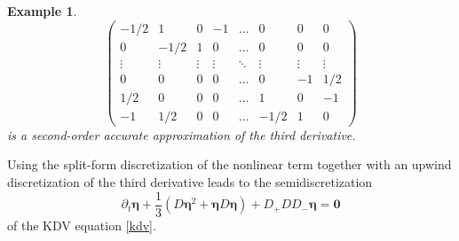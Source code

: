 \documentclass{article}
\newcommand{\ukdv}{\eta}
\newtheorem{example}{Example}
\begin{document}
\begin{example}
\begin{equation}
\begin{pmatrix}
            -1/2 & 1 & 0 & -1 & \dots & 0 & 0 & 0 \\
            0 & -1/2 & 1 & 0 & \dots & 0 & 0 & 0 \\
            \vdots & \vdots & \vdots & \vdots & \ddots & \vdots & \vdots & \vdots \\
            0 & 0 & 0 & 0 & \dots & 0 & -1 & 1/2 \\
            1/2 & 0 & 0 & 0 & \dots & 1 & 0 & -1 \\
            -1 & 1/2 & 0 & 0 & \dots & -1/2 & 1 & 0
        \end{pmatrix}
    \end{equation}
    is a second-order accurate approximation of the third derivative.
\end{example}

Using the split-form discretization of the nonlinear term together with
an upwind discretization of the third derivative leads to the semidiscretization
\begin{equation}
\label{eq:KdV-semidiscrete}
    \partial_t \pmb{\ukdv}
    + \frac{1}{3} \left( D \pmb{\ukdv}^2 + \pmb{\ukdv} D \pmb{\ukdv} \right)
    + D_+ D D_- \pmb{\ukdv}
    =
    \pmb{0}
\end{equation}
of the KDV equation \eqref{kdv}.
\end{document}
